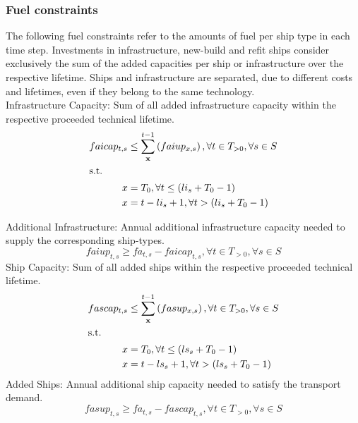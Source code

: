 \documentclass[article]{elsarticle}
\begin{document}
\subsubsection{Fuel constraints}
\noindent The following fuel constraints refer to the amounts of fuel per ship type in each time step. Investments in infrastructure, new-build and refit ships consider exclusively the sum of the added capacities per ship or infrastructure over the respective lifetime. Ships and infrastructure are separated, due to different costs and lifetimes, even if they belong to the same technology.
\\
Infrastructure Capacity: Sum of all added infrastructure capacity within the respective proceeded technical lifetime.
\begin{subequations}
    \begin{align}
        faicap_{t,s} &\leq \sum_{\textbf{x}}^{t-1} \left( faiup_{x,s} \right), \forall t \in T_{>0}, \forall s \in S\label{eq:faicap}\\
        \intertext{s.t.}
        x &= T_0, \forall t \leq \left(li_{s} + T_0 - 1\right)\\
        x &= t - li_{s} + 1, \forall t > \left(li_{s} + T_0 - 1\right)
    \end{align}
\end{subequations}
\par\noindent
Additional Infrastructure: Annual additional infrastructure capacity needed to supply the corresponding ship-types.
\begin{equation}
    faiup_{t,s} \geq fa_{t,s} - faicap_{t,s}, \forall t \in T_{>0}, \forall s \in S\label{eq:faiup}
\end{equation}
Ship Capacity: Sum of all added ships within the respective proceeded technical lifetime.
\begin{subequations}
    \begin{align}
        fascap_{t,s} &\leq \sum_{\textbf{x}}^{t-1} \left(fasup_{x,s} \right), \forall t \in T_{>0}, \forall s \in S\label{eq:fascap}\\
        \intertext{s.t.}
        x &= T_0, \forall t \leq \left(ls_{s} + T_0 - 1\right)\\
        x &= t - ls_{s} + 1, \forall t > \left(ls_{s} + T_0 - 1\right)
    \end{align}
\end{subequations}
Added Ships: Annual additional ship capacity needed to satisfy the transport demand.
\begin{equation}
    fasup_{t,s} \geq fa_{t,s} - fascap_{t,s}, \forall t \in T_{>0}, \forall s \in S\label{eq:fasup}
\end{equation}
\end{document}
